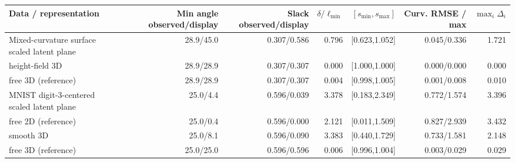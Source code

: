 \begin{tabular}{lrrrrrr}
\toprule
Data / representation & Min angle observed/display & Slack observed/display & $\delta/\ell_{\min}$ & $[s_{\min},s_{\max}]$ & Curv. RMSE / max & $\max_i\Delta_i$ \\
\midrule
Mixed-curvature surface scaled latent plane & 28.9/45.0 & 0.307/0.586 & 0.796 & [0.623,1.052] & 0.045/0.336 & 1.721 \\
 height-field 3D & 28.9/28.9 & 0.307/0.307 & 0.000 & [1.000,1.000] & 0.000/0.000 & 0.000 \\
 free 3D (reference) & 28.9/28.9 & 0.307/0.307 & 0.004 & [0.998,1.005] & 0.001/0.008 & 0.010 \\
\addlinespace
MNIST digit-3-centered scaled latent plane & 25.0/4.4 & 0.596/0.039 & 3.378 & [0.183,2.349] & 0.772/1.574 & 3.396 \\
 free 2D (reference) & 25.0/0.4 & 0.596/0.000 & 2.121 & [0.011,1.509] & 0.827/2.939 & 3.432 \\
 smooth 3D & 25.0/8.1 & 0.596/0.090 & 3.383 & [0.440,1.729] & 0.733/1.581 & 2.148 \\
 free 3D (reference) & 25.0/25.0 & 0.596/0.596 & 0.006 & [0.996,1.004] & 0.003/0.029 & 0.029 \\
\bottomrule
\end{tabular}
